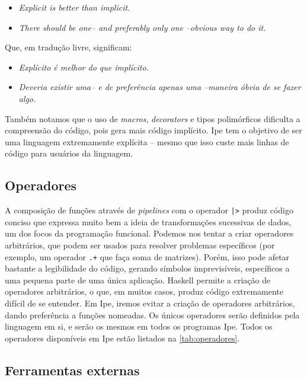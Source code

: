 \begin{itemize}
  \item \textit{Explicit is better than implicit.}
  \item \textit{There should be one-- and preferably only one --obvious way to do it.}
\end{itemize}

\cite{zenofpython}

Que, em tradução livre, significam:

\begin{itemize}
  \item \textit{Explícito é melhor do que implícito.}
  \item \textit{Deveria existir uma-- e de preferência apenas uma --maneira óbvia de se fazer algo.}
\end{itemize}

Também notamos que o uso de \textit{macros}, \textit{decorators} e tipos polimórficos
dificulta a compreensão do código, pois gera mais código implícito. Ipe tem o objetivo
de ser uma linguagem extremamente explícita -- mesmo que isso custe mais linhas
de código para usuários da linguagem.

\subsection{Operadores}

A composição de funções através de \textit{pipelines} com o operador
\texttt{|>} produz código conciso que expressa muito bem a ideia de transformações
sucessivas de dados, um dos focos da programação funcional. Podemos nos tentar
a criar operadores arbitrários, que podem ser usados para resolver problemas
específicos (por exemplo, um operador \texttt{.+} que faça soma de matrizes).
Porém, isso pode afetar bastante a legibilidade do código, gerando símbolos
imprevisíveis, específicos a uma pequena parte de uma única aplicação. Haskell
permite a criação de operadores arbitrários, o que, em muitos casos, produz
código extremamente difícil de se entender. Em Ipe, iremos evitar a criação de
operadores arbitrários, dando preferência a funções nomeadas. Os únicos operadores
serão definidos pela linguagem em si, e serão os mesmos em todos os programas Ipe.
Todos os operadores disponíveis em Ipe estão listados na \autoref{tab:operadores}.

\subsection{Ferramentas externas}

